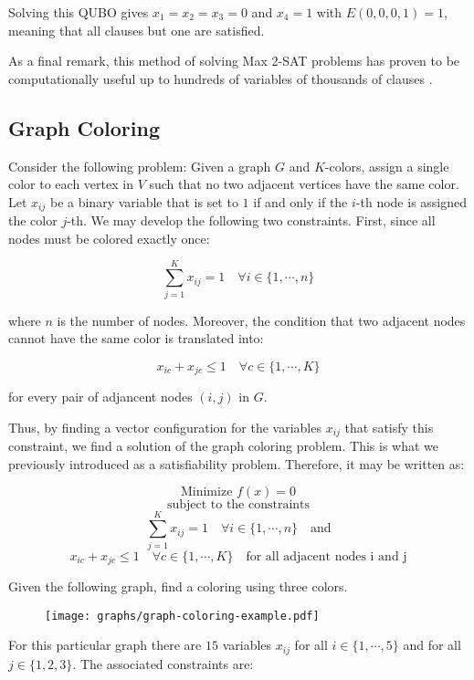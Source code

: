 Solving this QUBO gives $x_1 = x_2 = x_3 = 0$ and $x_4 = 1$ with $E(0, 0, 0, 1) = 1$, meaning that all clauses but one are satisfied.

As a final remark, this method of solving Max 2-SAT problems has proven to be computationally useful up to hundreds of variables of thousands of clauses \cite{Kochenberger2005}.


\subsection{Graph Coloring}
\label{sec:graph-coloring}


Consider the following problem: Given a graph $G$ and $K$-colors, assign a single color to each vertex in $V$ such that no two adjacent vertices have the same color. Let $x_{ij}$ be a binary variable that is set to $1$ if and only if the $i$-th node is assigned the color $j$-th. We may develop the following two constraints. First, since all nodes must be colored exactly once:

$$ \sum_{j=1}^K x_{ij} = 1 \quad \forall i \in \{1, \cdots, n\} $$

where $n$ is the number of nodes. Moreover, the condition that two adjacent nodes cannot have the same color is translated into:

$$ x_{ic} + x_{jc} \leq 1 \quad \forall c \in \{1, \cdots, K\} $$

for every pair of adjancent nodes $(i,j)$ in $G$.

Thus, by finding a vector configuration for the variables $x_{ij}$ that satisfy this constraint, we find a solution of the graph coloring problem. This is what we previously introduced as a satisfiability problem. Therefore, it may be written as:

$$ \text{Minimize } f(x) = 0 $$
$$ \text{subject to the constraints} $$
$$ \sum_{j=1}^K x_{ij} = 1 \quad \forall i \in \{1, \cdots, n\} \quad \text{and}$$
$$ x_{ic} + x_{jc} \leq 1 \quad \forall c \in \{1, \cdots, K\} \quad \text{for all adjacent nodes i and j}$$




Given the following graph, find a coloring using three colors.

\begin{figure}[H]
	\texttt{[image: graphs/graph-coloring-example.pdf]}
	\centering
\end{figure}

For this particular graph there are $15$ variables $x_{ij}$ for all $i \in \{1, \cdots, 5\}$ and for all $j \in \{1, 2, 3\}$. The associated constraints are:

